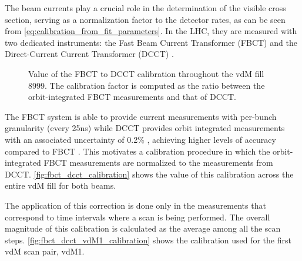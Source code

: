 The beam currents play a crucial role in the determination of the visible cross section, serving as a normalization factor to the detector rates, as can be seen from \autoref{eq:calibration_from_fit_parameters}. In the LHC, they are measured with two dedicated instruments: the Fast Beam Current Transformer (FBCT) \cite{Belohrad:1267400} and the Direct-Current Current Transformer (DCCT) \cite{Odier:1183400}.

\begin{figure}[!htb]
	\centering
	\caption[FBCT to DCCT calibration]{Value of the FBCT to DCCT calibration throughout the vdM fill 8999. The calibration factor is computed as the ratio between the orbit-integrated FBCT measurements and that of DCCT.}
	\label{fig:fbct_dcct_calibration}
\end{figure}

The FBCT system is able to provide current measurements with per-bunch granularity (every 25ns) while DCCT provides orbit integrated measurements with an associated uncertainty of 0.2\% \cite{Barschel:2649533}, achieving higher levels of accuracy compared to FBCT \cite{Gras:1379466}. This motivates a calibration procedure in which the orbit-integrated FBCT measurements are normalized to the measurements from DCCT. \autoref{fig:fbct_dcct_calibration} shows the value of this calibration across the entire vdM fill for both beams.

The application of this correction is done only in the measurements that correspond to time intervals where a scan is being performed. The overall magnitude of this calibration is calculated as the average among all the scan steps. \autoref{fig:fbct_dcct_vdM1_calibration} shows the calibration used for the first vdM scan pair, vdM1.

